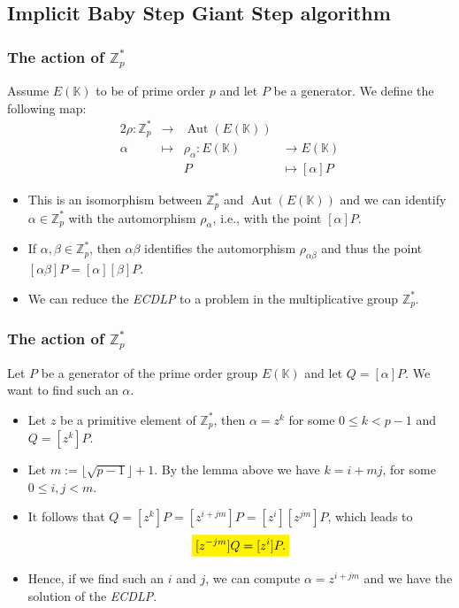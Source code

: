 \documentclass[
	11pt, %
]{beamer}
\newcommand{\Z}{\mathbb{Z}}
\newcommand{\Zpstar}{\Z_p^*}
\newcommand{\K}{\mathbb{K}}
\newcommand{\highlight}[2][yellow]{\mathchoice%
	{\colorbox{#1}{$\displaystyle#2$}}%
	{\colorbox{#1}{$\textstyle#2$}}%
	{\colorbox{#1}{$\scriptstyle#2$}}%
	{\colorbox{#1}{$\scriptscriptstyle#2$}}}%
\theoremstyle{definition}
\theoremstyle{remark}
\DeclareMathOperator{\aut}{Aut}
\begin{document}
\subsection{Implicit Baby Step Giant Step algorithm}
\begin{frame}
\frametitle{The action of $\Zpstar$}
Assume $E(\K)$ to be of prime order $p$ and let $P$ be a generator. We define the following map:
\begin{alignat*}{2}
	\rho: \Zpstar &\longrightarrow& \aut(E(\K)) \\
	\alpha &\longmapsto&\rho_\alpha:E(\K)&\longrightarrow E(\K)\\
	&&P&\longmapsto[\alpha]P
\end{alignat*}
\begin{itemize}
	\item This is an isomorphism between $\Zpstar$ and $\aut(E(\K))$ and we can identify $\alpha\in\Zpstar$ with the automorphism $\rho_\alpha$, i.e., with the point $[\alpha]P$. 
	\item If $\alpha,\beta\in\Zpstar$, then $\alpha\beta$ identifies the automorphism $\rho_{\alpha\beta}$ and thus the point $[\alpha\beta]P=[\alpha][\beta]P$.
	\item We can reduce the \emph{ECDLP} to a problem in the multiplicative group $\Zpstar$.
\end{itemize}

\end{frame}


\begin{frame}
	\frametitle{The action of $\Zpstar$}
Let $P$ be a generator of the prime order group $E(\K)$ and let $Q=[\alpha]P$. We want to find such an $\alpha$.
\begin{itemize}
\item Let $z$ be a primitive element of $\Zpstar$, then $\alpha=z^k$ for some $0\leq k<p-1$ and $Q=[z^k]P$. 
\item Let $m:=\lfloor \sqrt{p-1}\rfloor+1$. By the lemma above we have $k=i+mj$, for some $0\leq i,j< m$.
\item It follows that $Q=[z^k]P=[z^{i+jm}]P=[z^i][z^{jm}]P$, which leads to $$\highlight{[z^{-jm}]Q=[z^i]P.}$$ 
\item Hence, if we find such an $i$ and $j$, we can compute $\alpha=z^{i+jm}$ and we have the solution of the \emph{ECDLP}.
\end{itemize}
\end{frame}
\end{document}
